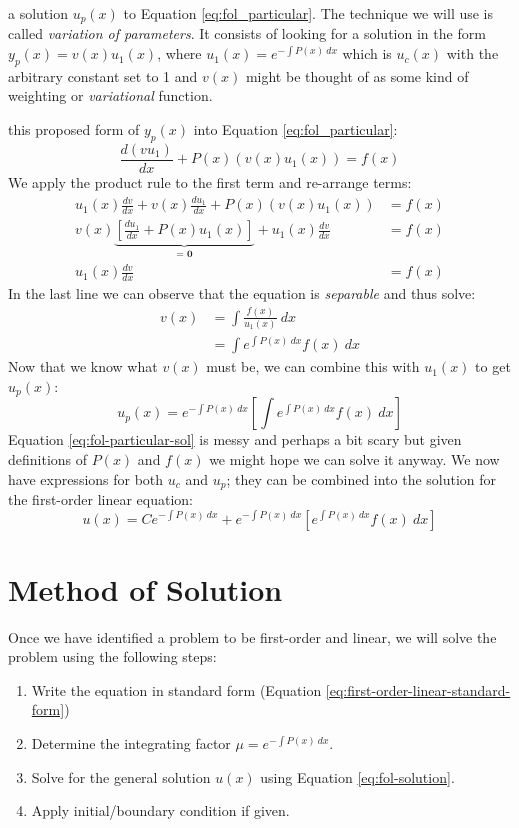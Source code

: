  a solution $u_p(x)$ to Equation \ref{eq:fol_particular}.  The technique we will use is called \emph{variation of parameters}.  It consists of looking for a solution in the form $y_p(x) = v(x)u_1(x)$, where $u_1(x) = e^{-\int P(x) \ dx}$ which is $u_c(x)$ with the arbitrary constant set to 1 and $v(x)$ might be thought of as some kind of weighting or \emph{variational} function.

 this proposed form of $y_p(x)$ into Equation \ref{eq:fol_particular}:
\begin{equation*}
\frac{d(vu_1)}{dx} + P(x)(v(x)u_1(x))=f(x)
\end{equation*}
We apply the product rule to the first term and re-arrange terms:
\begin{align*}
u_1(x)\frac{dv}{dx}+ v(x)\frac{du_1}{dx} + P(x)(v(x)u_1(x)) &= f(x) \\
v(x)\underbrace{\left[\frac{du_1}{dx}+P(x)u_1(x) \right]}_{\textbf{= 0}}+u_1(x)\frac{dv}{dx} &= f(x) \\
u_1(x)\frac{dv}{dx} &= f(x)
\end{align*}
In the last line we can observe that the equation is \emph{separable} and thus solve:
\begin{align*}
v(x) &= \int \frac{f(x)}{u_1(x)} \ dx \\
     &= \int e^{\int P(x) \ dx}f(x) \ dx
\end{align*}
Now that we know what $v(x)$ must be, we can combine this with $u_1(x)$ to get $u_p(x)$:
\begin{equation}
u_p(x) = e^{-\int P(x) \ dx}\left[\int e^{\int P(x) \ dx}f(x) \ dx \right]
\label{eq:fol-particular-sol}
\end{equation}
Equation \ref{eq:fol-particular-sol} is messy and perhaps a bit scary but given definitions of $P(x)$ and $f(x)$ we might hope we can solve it anyway.  We now have expressions for both $u_c$ and $u_p$; they can be combined into the solution for the first-order linear equation:
\begin{equation}
u(x) = Ce^{-\int P(x) \ dx} + e^{-\int P(x) \ dx} \left[e^{\int P(x) \ dx} f(x) \ dx \right]
\label{eq:fol-solution}
\end{equation}

\section{Method of Solution}
Once we have identified a problem to be first-order and linear, we will solve the problem using the following steps:
\begin{enumerate}
\item Write the equation in standard form (Equation \ref{eq:first-order-linear-standard-form})
\item Determine the integrating factor $\mu = e^{-\int P(x) \ dx}$.
\item Solve for the general solution $u(x)$ using Equation \ref{eq:fol-solution}.
\item Apply initial/boundary condition if given.
\end{enumerate}

